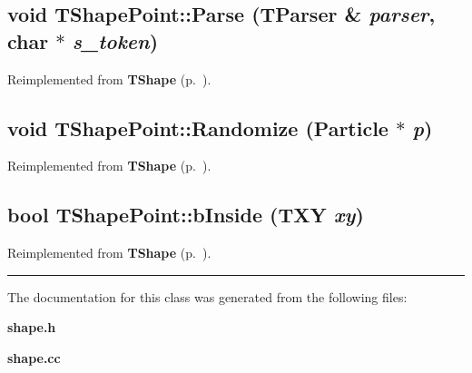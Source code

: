 \label{TShapePoint_a1}
\subsection{\setlength{\rightskip}{0pt plus 5cm}void TShape\-Point::Parse ({\bf TParser} \& {\em parser}, char $\ast$ {\em s\_\-token})\hspace{0.3cm}{\tt  [virtual]}}



Reimplemented from {\bf TShape} {\rm (p.~\pageref{TShape_a0})}.\label{TShapePoint_a2}
\subsection{\setlength{\rightskip}{0pt plus 5cm}void TShape\-Point::Randomize ({\bf Particle} $\ast$ {\em p})\hspace{0.3cm}{\tt  [virtual]}}



Reimplemented from {\bf TShape} {\rm (p.~\pageref{TShape_a1})}.\label{TShapePoint_a3}
\subsection{\setlength{\rightskip}{0pt plus 5cm}bool TShape\-Point::b\-Inside ({\bf TXY} {\em xy})\hspace{0.3cm}{\tt  [virtual]}}



Reimplemented from {\bf TShape} {\rm (p.~\pageref{TShape_a2})}.\vspace{0.4cm}\hrule\vspace{0.2cm}
The documentation for this class was generated from the following files:\begin{CompactItemize}
\item 
{\bf shape.h}\item 
{\bf shape.cc}\end{CompactItemize}
